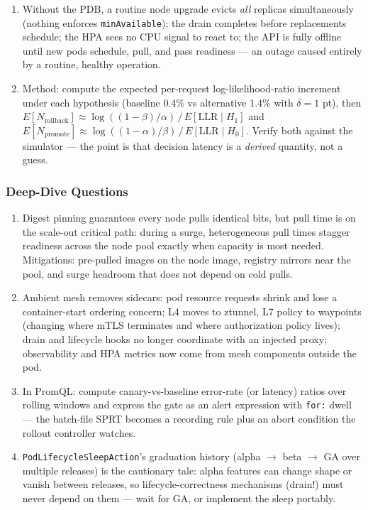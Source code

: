 \begin{enumerate}[label=\textbf{Exercise 7.\arabic*}, leftmargin=3.4em]
    --- endpoint propagation, in-flight drain, and the kubelet's hard kill.
  \item Without the PDB, a routine node upgrade evicts \emph{all} replicas
    simultaneously (nothing enforces \texttt{minAvailable}); the drain
    completes before replacements schedule; the HPA sees no CPU signal to
    react to; the API is fully offline until new pods schedule, pull, and
    pass readiness --- an outage caused entirely by a routine, healthy
    operation.
  \item Method: compute the expected per-request log-likelihood-ratio
    increment under each hypothesis (baseline 0.4\% vs alternative 1.4\%
    with $\delta = 1$ pt), then $E[N_{\text{rollback}}] \approx
    \log((1-\beta)/\alpha)\,/\,E[\mathrm{LLR} \mid H_1]$ and
    $E[N_{\text{promote}}] \approx \log((1-\alpha)/\beta)\,/\,
    E[\mathrm{LLR} \mid H_0]$. Verify both against the simulator --- the
    point is that decision latency is a \emph{derived} quantity, not a
    guess.
\end{enumerate}

\subsubsection*{Deep-Dive Questions}

\begin{enumerate}[label=\textbf{D17.\arabic*.}, leftmargin=2.8em]
  \item Digest pinning guarantees every node pulls identical bits, but pull
    time is on the scale-out critical path: during a surge, heterogeneous
    pull times stagger readiness across the node pool exactly when capacity
    is most needed. Mitigations: pre-pulled images on the node image,
    registry mirrors near the pool, and surge headroom that does not depend
    on cold pulls.
  \item Ambient mesh removes sidecars: pod resource requests shrink and
    lose a container-start ordering concern; L4 moves to ztunnel, L7 policy
    to waypoints (changing where mTLS terminates and where authorization
    policy lives); drain and lifecycle hooks no longer coordinate with an
    injected proxy; observability and HPA metrics now come from mesh
    components outside the pod.
  \item In PromQL: compute canary-vs-baseline error-rate (or latency)
    ratios over rolling windows and express the gate as an alert expression
    with \texttt{for:} dwell --- the batch-file SPRT becomes a recording
    rule plus an abort condition the rollout controller watches.
  \item \texttt{PodLifecycleSleepAction}'s graduation history (alpha
    $\to$ beta $\to$ GA over multiple releases) is the cautionary tale:
    alpha features can change shape or vanish between releases, so
    lifecycle-correctness mechanisms (drain!) must never depend on them ---
    wait for GA, or implement the sleep portably.
\end{enumerate}

